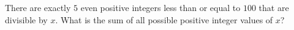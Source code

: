 There are exactly $5$ even positive integers less than or equal to $100$ that are divisible by $x$. What is the sum of all possible positive integer values of $x$?
